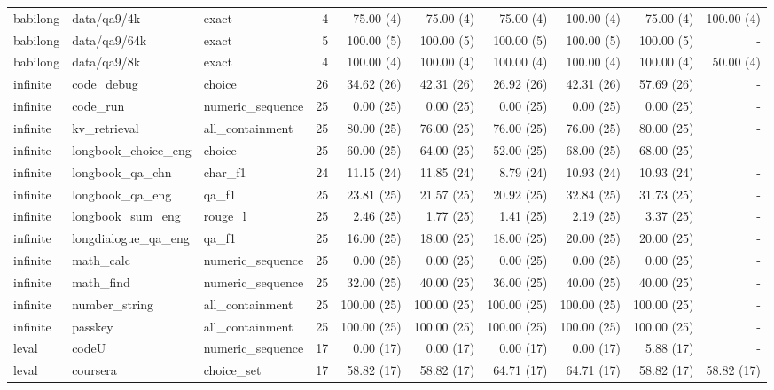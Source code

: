 \begin{landscape}
\begin{longtable}{@{}p{19mm}p{52mm}p{25mm}rrrrrrr@{}}
babilong & data/qa9/4k & exact & 4 & 75.00 (4) & 75.00 (4) & 75.00 (4) & 100.00 (4) & 75.00 (4) & 100.00 (4) \\
babilong & data/qa9/64k & exact & 5 & 100.00 (5) & 100.00 (5) & 100.00 (5) & 100.00 (5) & 100.00 (5) & - \\
babilong & data/qa9/8k & exact & 4 & 100.00 (4) & 100.00 (4) & 100.00 (4) & 100.00 (4) & 100.00 (4) & 50.00 (4) \\
infinite & code\_debug & choice & 26 & 34.62 (26) & 42.31 (26) & 26.92 (26) & 42.31 (26) & 57.69 (26) & - \\
infinite & code\_run & numeric\_sequence & 25 & 0.00 (25) & 0.00 (25) & 0.00 (25) & 0.00 (25) & 0.00 (25) & - \\
infinite & kv\_retrieval & all\_containment & 25 & 80.00 (25) & 76.00 (25) & 76.00 (25) & 76.00 (25) & 80.00 (25) & - \\
infinite & longbook\_choice\_eng & choice & 25 & 60.00 (25) & 64.00 (25) & 52.00 (25) & 68.00 (25) & 68.00 (25) & - \\
infinite & longbook\_qa\_chn & char\_f1 & 24 & 11.15 (24) & 11.85 (24) & 8.79 (24) & 10.93 (24) & 10.93 (24) & - \\
infinite & longbook\_qa\_eng & qa\_f1 & 25 & 23.81 (25) & 21.57 (25) & 20.92 (25) & 32.84 (25) & 31.73 (25) & - \\
infinite & longbook\_sum\_eng & rouge\_l & 25 & 2.46 (25) & 1.77 (25) & 1.41 (25) & 2.19 (25) & 3.37 (25) & - \\
infinite & longdialogue\_qa\_eng & qa\_f1 & 25 & 16.00 (25) & 18.00 (25) & 18.00 (25) & 20.00 (25) & 20.00 (25) & - \\
infinite & math\_calc & numeric\_sequence & 25 & 0.00 (25) & 0.00 (25) & 0.00 (25) & 0.00 (25) & 0.00 (25) & - \\
infinite & math\_find & numeric\_sequence & 25 & 32.00 (25) & 40.00 (25) & 36.00 (25) & 40.00 (25) & 40.00 (25) & - \\
infinite & number\_string & all\_containment & 25 & 100.00 (25) & 100.00 (25) & 100.00 (25) & 100.00 (25) & 100.00 (25) & - \\
infinite & passkey & all\_containment & 25 & 100.00 (25) & 100.00 (25) & 100.00 (25) & 100.00 (25) & 100.00 (25) & - \\
leval & codeU & numeric\_sequence & 17 & 0.00 (17) & 0.00 (17) & 0.00 (17) & 0.00 (17) & 5.88 (17) & - \\
leval & coursera & choice\_set & 17 & 58.82 (17) & 58.82 (17) & 64.71 (17) & 64.71 (17) & 58.82 (17) & 58.82 (17) \\

\end{longtable}
\end{landscape}
